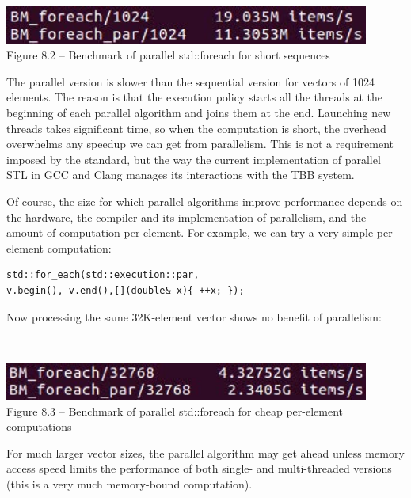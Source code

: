 \hspace*{\fill} \\ %
\begin{center}
\includegraphics[width=0.9\textwidth]{content/2/chapter8/images/2.jpg}\\
Figure 8.2 – Benchmark of parallel std::foreach for short sequences
\end{center}

The parallel version is slower than the sequential version for vectors of 1024 elements. The reason is that the execution policy starts all the threads at the beginning of each parallel algorithm and joins them at the end. Launching new threads takes significant time, so when the computation is short, the overhead overwhelms any speedup we can get from parallelism. This is not a requirement imposed by the standard, but the way the current implementation of parallel STL in GCC and Clang manages its interactions with the TBB system. 

Of course, the size for which parallel algorithms improve performance depends on the hardware, the compiler and its implementation of parallelism, and the amount of computation per element. For example, we can try a very simple per-element computation:

\begin{lstlisting}[style=styleCXX]
std::for_each(std::execution::par,
v.begin(), v.end(),[](double& x){ ++x; });
\end{lstlisting}

Now processing the same 32K-element vector shows no benefit of parallelism:

\hspace*{\fill} \\ %
\begin{center}
\includegraphics[width=0.9\textwidth]{content/2/chapter8/images/3.jpg}\\
Figure 8.3 – Benchmark of parallel std::foreach for cheap per-element computations
\end{center}

For much larger vector sizes, the parallel algorithm may get ahead unless memory access speed limits the performance of both single- and multi-threaded versions (this is a very much memory-bound computation). 

